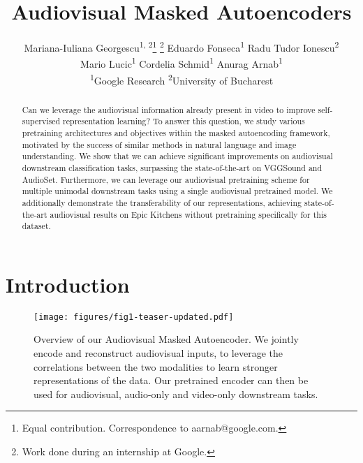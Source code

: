 \documentclass[10pt,twocolumn,letterpaper]{article}
\begin{document}
\title{Audiovisual Masked Autoencoders}


\author{
	Mariana-Iuliana Georgescu\textsuperscript{1, 2}\thanks{Equal contribution. Correspondence to aarnab@google.com.}  \thanks{Work done during an internship at Google.}	\qquad Eduardo Fonseca\textsuperscript{1}	\qquad Radu Tudor Ionescu\textsuperscript{2}	\\
    Mario Lucic\textsuperscript{1} 
	\qquad Cordelia Schmid\textsuperscript{1}	\qquad Anurag Arnab\textsuperscript{1}\footnotemark[1] \\
	\textsuperscript{1}Google Research \qquad \textsuperscript{2}University of Bucharest \\
}

\maketitle


\begin{abstract}

Can we leverage the audiovisual information already present in video to improve self-supervised representation learning?
To answer this question, we study various pretraining architectures and objectives within the masked autoencoding framework, motivated by the success of similar methods in natural language and image understanding.
We show that we can achieve significant improvements on audiovisual downstream classification tasks, surpassing the state-of-the-art on VGGSound and AudioSet.
Furthermore, we can leverage our audiovisual pretraining scheme for multiple unimodal downstream tasks using a single audiovisual pretrained model.
We additionally demonstrate the transferability of our representations, achieving state-of-the-art audiovisual results on Epic Kitchens without pretraining specifically for this dataset.
\vspace{-0.5\baselineskip}

\end{abstract} 


\vspace{-0.5\baselineskip}
\section{Introduction}
\vspace{-1mm}


\begin{figure}[t]
    \centering
    \vspace{-1.5\baselineskip}
    \texttt{[image: figures/fig1-teaser-updated.pdf]}
    \vspace{-0.5\baselineskip}
    \caption{
    	Overview of our Audiovisual Masked Autoencoder.
    	We jointly encode and reconstruct audiovisual inputs, to leverage the correlations between the two modalities to learn stronger representations of the data.
    	Our pretrained encoder can then be used for audiovisual, audio-only and video-only downstream tasks.
        \vspace{-2\baselineskip}
	}
    \label{fig:teaser}
\end{figure}
\end{document}
